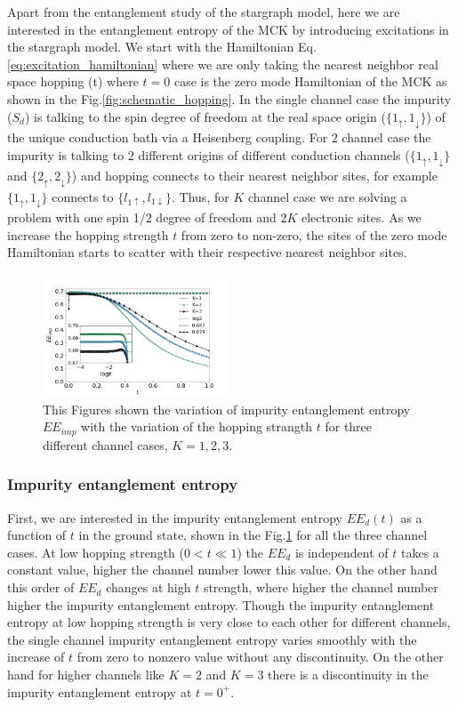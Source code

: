 \documentclass[reprint,prb,superscriptaddress]{revtex4-2}
\begin{document}
\noindent Apart from the entanglement study of the stargraph model, here we are interested in the entanglement entropy of the MCK by introducing excitations in the stargraph model. We start with the Hamiltonian Eq.\eqref{eq:excitation_hamiltonian} where we are only taking the nearest neighbor real space hopping (t) where $t=0$ case is the zero mode Hamiltonian of the MCK as shown in the Fig.\ref{fig:schematic_hopping}. In the single channel case the impurity ($S_d$) is talking to the spin degree of freedom at the real space origin ($\{1_{\uparrow},1_{\downarrow}\}$) of the unique conduction bath via a Heisenberg coupling. For $2$ channel case the impurity is talking to $2$ different origins of different conduction channels ($\{1_{\uparrow},1_{\downarrow}\}$ and $\{2_{\uparrow},2_{\downarrow}\}$) and hopping connects to their nearest neighbor sites, for example $\{1_{\uparrow},1_{\downarrow}\}$ connects to $\{l_{1\uparrow},l_{1\downarrow}\}$. Thus, for $K$ channel case we are solving a problem with one spin 1/2 degree of freedom and $2K$ electronic sites. As we increase the hopping strength $t$ from zero to non-zero, the sites of the zero mode Hamiltonian starts to scatter with their respective nearest neighbor sites.
\begin{figure}[!htpb]
\centering
\includegraphics[width=0.49\textwidth]{plt/A_I1_ch123_['d']}
\caption{This Figures shown the variation of impurity entanglement entropy $EE_{imp}$ with the variation of the hopping strangth $t$ for three different channel cases, $K=1,2,3$. }
\label{fig:EE_imp_vs_t_K}
\end{figure}

\subsubsection{Impurity entanglement entropy}
\noindent  First, we are interested in the impurity entanglement entropy $EE_d(t)$  as a function of $t$ in the ground state, shown in the Fig.\ref{fig:EE_imp_vs_t_K} for all the three channel cases. At low hopping strength ($0<t\ll 1$) the $EE_{d}$ is independent of $t$ takes a constant value, higher the channel number lower this value. On the other hand this order of $EE_{d}$ changes at high $t$ strength, where higher the channel number higher the impurity entanglement entropy. Though the impurity entanglement entropy at low hopping strength is very close to each other for different channels, the single channel impurity entanglement entropy varies smoothly with the increase of $t$ from zero to nonzero value without any discontinuity. On the other hand for higher channels like $K=2$ and $K=3$ there is a discontinuity in the impurity entanglement entropy at $t=0^+$.
\end{document}
